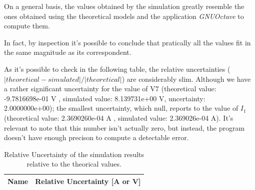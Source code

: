 On a general basis, the values obtained by the simulation greatly resemble the ones obtained using the theoretical models and the application \textit{GNUOctave} to compute them.

In fact, by inspection it's possible to conclude that pratically all the values fit in the same magnitude as its correspondent. 

As it's possible to check in the following table, the relative uncertainties ($|theoretical - simulated|/|theoretical|$) are considerably slim.
Although we have a rather significant uncertainty for the value of V7 (theoretical value: -9.7816698e-01 V , simulated value: 8.139731e+00 V, uncertainty: 2.0000000e+00); the smallest uncertainty, which null, reports to the value of $I_1$ (theoretical value: 2.3690260e-04 A , simulated value: 2.369026e-04 A). It's relevant to note that this number isn't actually zero, but instead, the program doesn't have enough precison to compute a detectable error. 

\begin{table}[htb!]
  \centering
  \begin{tabular}{|l|r|}
    \hline    
    {\bf Name} & {\bf Relative Uncertainty [A or V]} \\ \hline
    
  \end{tabular}
  \caption{Relative Uncertainty of the simulation results relative to the theorical values.}
  \label{tab:errors}
\end{table}

